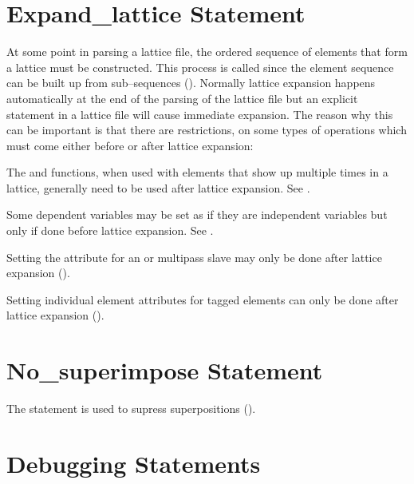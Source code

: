 \section{Expand_lattice Statement}
\label{s:expand}

At some point in parsing a lattice file, the ordered sequence of
elements that form a lattice must be constructed. This process is called
 since the element sequence can be built up from
sub--sequences (). Normally lattice expansion happens
automatically at the end of the parsing of the lattice file but an
explicit  statement in a lattice file will cause
immediate expansion. The reason why this can be important is that there
are restrictions, on some types of operations which must come either
before or after lattice expansion:
\begin{Itemize}
\item 
{}
The  and  functions, when used with elements
that show up multiple times in a lattice, generally need to be used
after lattice expansion. See .
\item 
Some dependent variables may be set as if they are independent
variables but only if done before lattice expansion. See .
\item 
Setting the  attribute for an 
 or  multipass
slave may only be done after lattice expansion ().
\item
{}
Setting individual element attributes for tagged elements can only be done
after lattice expansion ().
\end{Itemize}

\section{No_superimpose Statement}
\label{s:no.superimpose}

The  statement is used to supress superpositions
(). 

\section{Debugging Statements}

